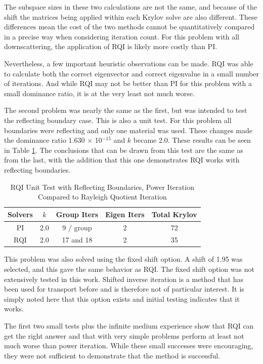 The subspace sizes in these two calculations are not the same, and because of the shift the matrices being applied within each Krylov solve are also different. These differences mean the cost of the two methods cannot be quantitatively compared in a precise way when considering iteration count. For this problem with all downscattering, the application of RQI is likely more costly than PI. 

Nevertheless, a few important heuristic observations can be made. RQI was able to calculate both the correct eigenvector and correct eigenvalue in a small number of iterations. And while RQI may not be better than PI for this problem with a small dominance ratio, it is at the very least not much worse. 

The second problem was nearly the same as the first, but was intended to test the reflecting boundary case. This is also a unit test. For this problem all boundaries were reflecting and only one material was used. These changes made the dominance ratio 1.630 $\times$ 10$^{-15}$ and $k$ became 2.0. These results can be seen in Table \ref{table:SmallReflectingRQI}. The conclusions that can be drawn from this test are the same as from the last, with the addition that this one demonstrates RQI works with reflecting boundaries. 
%
\begin{table}[!h]
\caption{RQI Unit Test with Reflecting Boundaries, Power Iteration Compared to Rayleigh Quotient Iteration}
\begin{center}
\begin{tabular}{| c | c | c | c | c |}
\hline
Solvers & $k$ &  Group Iters & Eigen Iters & Total Krylov \\[0.5ex]
\hline
PI & 2.0 & 9 / group & 2 & 72 \\
RQI & 2.0 & 17 and 18 & 2 & 35 \\
\hline
\end{tabular}
\end{center}
\label{table:SmallReflectingRQI}
\end{table}

This problem was also solved using the fixed shift option. A shift of 1.95 was selected, and this gave the same behavior as RQI. The fixed shift option was not extensively tested in this work. Shifted inverse iteration is a method that has been used for transport before and is therefore not of particular interest. It is simply noted here that this option exists and initial testing indicates that it works. 

The first two small tests plus the infinite medium experience show that RQI can get the right answer and that with very simple problems perform at least not much worse than power iteration. While these small successes were encouraging, they were not sufficient to demonstrate that the method is successful. 


